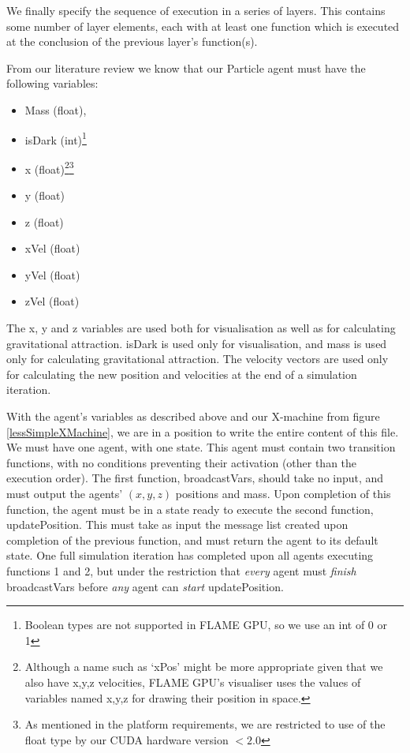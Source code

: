 \documentclass[11pt,a4paper]{article}
\begin{document}
We finally specify the sequence of execution in a series of layers. This contains some number of layer elements, each with at least one function which is executed at the conclusion of the previous layer's function(s).

From our literature review we know that our Particle agent must have the following variables: 
\begin{itemize} 
\item Mass (float), 
\item isDark (int)\footnote{Boolean types are not supported in FLAME GPU, so we use an int of 0 or 1}
\item x (float)\footnote{Although a name such as `xPos' might be more appropriate given that we also have x,y,z velocities, FLAME GPU's visualiser uses the values of variables named x,y,z for drawing their position in space.}\footnote{As mentioned in the platform requirements, we are restricted to use of the float type by our CUDA hardware version $<2.0$}
\item y (float)
\item z (float)
\item xVel (float)
\item yVel (float)
\item zVel (float)
\end{itemize}

The x, y and z variables are used both for visualisation as well as for calculating gravitational attraction. isDark is used only for visualisation, and mass is used only for calculating gravitational attraction. The velocity vectors are used only for calculating the new position and velocities at the end of a simulation iteration.

With the agent's variables as described above and our X-machine from figure \ref{lessSimpleXMachine}, we are in a position to write the entire content of this file. We must have one agent, with one state. This agent must contain two transition functions, with no conditions preventing their activation (other than the execution order). The first function, broadcastVars, should take no input, and must output the agents' $(x,y,z)$ positions and mass. Upon completion of this function, the agent must be in a state ready to execute the second function, updatePosition. This must take as input the message list created upon completion of the previous function, and must return the agent to its default state. One full simulation iteration has completed upon all agents executing functions 1 and 2, but under the restriction that \emph{every} agent must \emph{finish} broadcastVars before \emph{any} agent can \emph{start} updatePosition.
\end{document}
